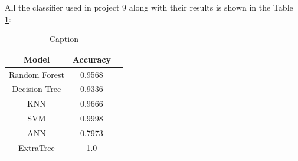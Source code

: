 \documentclass[11pt,en]{elegantpaper}
\begin{document}
All the classifier used in project 9 along with their results is shown in the Table \ref{tab:my_label}:

\begin{table}[]
    \centering
    \begin{tabular}{ccc}
\toprule
Model&Accuracy\\
\midrule
Random Forest&0.9568\\
Decision Tree&0.9336\\
KNN&0.9666\\
SVM&0.9998\\
ANN&0.7973\\
ExtraTree&1.0\\
\bottomrule
\end{tabular}
    \caption{Caption}
    \label{tab:my_label}
\end{table}



\end{document}
